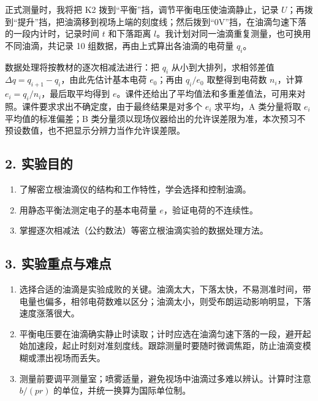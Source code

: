 正式测量时，我将把 K2 拨到“平衡”挡，调节平衡电压使油滴静止，记录 $U$；再拨到“提升”挡，把油滴移到视场上端的刻度线；然后拨到“0V”挡，在油滴匀速下落的一段内计时，记录时间 $t$ 和下落距离 $l$。我计划对同一油滴重复测量，也可换用不同油滴，共记录 10 组数据，再由上式算出各油滴的电荷量 $q_i$。

数据处理将按教材的逐次相减法进行：把 $q_i$ 从小到大排列，求相邻差值 $\Delta q=q_{i+1}-q_i$，由此先估计基本电荷 $e_0$；再由 $q_i/e_0$ 取整得到电荷数 $n_i$，计算 $e_i=q_i/n_i$，最后取平均得到 $e$。课件还给出了平均值法和多重差值法，可用来对照。课件要求求出不确定度，由于最终结果是对多个 $e_i$ 求平均，A 类分量将取 $e_i$ 平均值的标准偏差；B 类分量须以现场仪器给出的允许误差限为准，本次预习不预设数值，也不把显示分辨力当作允许误差限。

\subsection*{2. 实验目的}

\begin{enumerate}
\item 了解密立根油滴仪的结构和工作特性，学会选择和控制油滴。
\item 用静态平衡法测定电子的基本电荷量 $e$，验证电荷的不连续性。
\item 掌握逐次相减法（公约数法）等密立根油滴实验的数据处理方法。
\end{enumerate}

\subsection*{3. 实验重点与难点}

\begin{enumerate}
\item 选择合适的油滴是实验成败的关键。油滴太大，下落太快，不易测准时间，带电量也偏多，相邻电荷数难以区分；油滴太小，则受布朗运动影响明显，下落速度涨落很大。
\item 平衡电压要在油滴确实静止时读取；计时应选在油滴匀速下落的一段，避开起始加速段，起止时刻对准刻度线。跟踪测量时要随时微调焦距，防止油滴变模糊或漂出视场而丢失。
\item 测量前要调平测量室；喷雾适量，避免视场中油滴过多难以辨认。计算时注意 $b/(pr)$ 的单位，并统一换算为国际单位制。
\end{enumerate}
